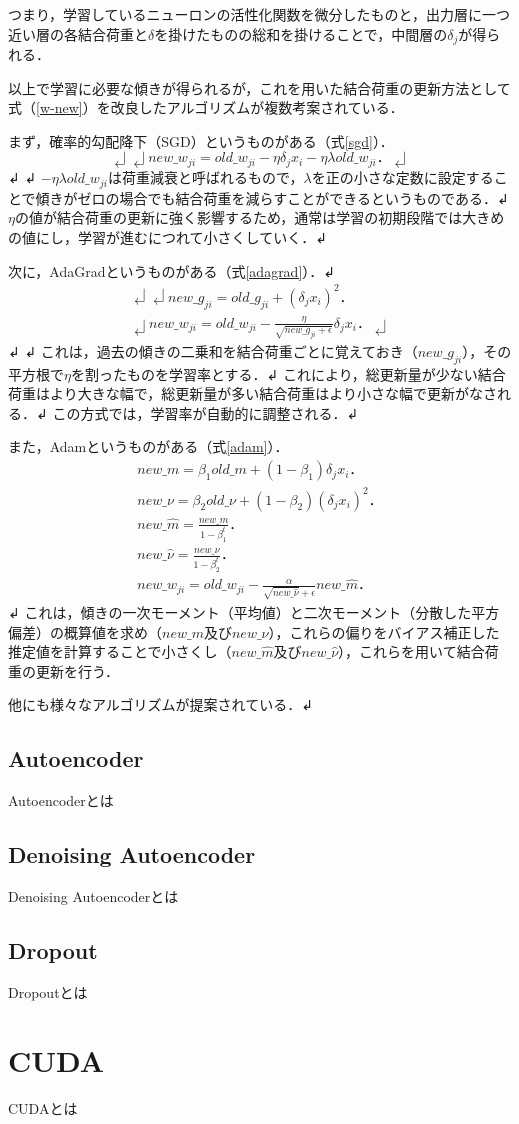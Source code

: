 つまり，学習しているニューロンの活性化関数を微分したものと，出力層に一つ近い層の各結合荷重と$\delta$を掛けたものの総和を掛けることで，中間層の$\delta_j$が得られる．

以上で学習に必要な傾きが得られるが，これを用いた結合荷重の更新方法として式（\ref{w-new}）を改良したアルゴリズムが複数考案されている．

まず，確率的勾配降下（SGD）というものがある（式\ref{sgd}）．
\begin{equation}↲
\label{sgd}↲
new\_w_{ji} = old\_w_{ji} - \eta \delta_j x_i - \eta \lambda old\_w_{ji}．↲
\end{equation}↲
↲
$- \eta \lambda old\_w_{ji}$は荷重減衰と呼ばれるもので，$\lambda$を正の小さな定数に設定することで傾きがゼロの場合でも結合荷重を減らすことができるというものである．↲
$\eta$の値が結合荷重の更新に強く影響するため，通常は学習の初期段階では大きめの値にし，学習が進むにつれて小さくしていく．↲

次に，AdaGradというものがある（式\ref{adagrad}）．↲
\begin{eqnarray}↲
\label{adagrad}↲
new\_g_{ji} = old\_g_{ji} + (\delta_j x_i)^2． \nonumber \\↲
new\_w_{ji} = old\_w_{ji} - \frac{\eta}{\sqrt{new\_g_{ji} + \epsilon}} \delta_j x_i．↲
\end{eqnarray}↲
↲
これは，過去の傾きの二乗和を結合荷重ごとに覚えておき（$new\_g_{ji}$），その平方根で$\eta$を割ったものを学習率とする．↲
これにより，総更新量が少ない結合荷重はより大きな幅で，総更新量が多い結合荷重はより小さな幅で更新がなされる．↲
この方式では，学習率が自動的に調整される．↲

また，Adamというものがある（式\ref{adam}）．
\begin{eqnarray}
\label{adam}
new\_m = \beta_1 old\_m + (1 - \beta_1) \delta_j x_i．\nonumber \\
new\_\nu = \beta_2 old\_\nu + (1 - \beta_2) (\delta_j x_i)^2．\nonumber \\
new\_\hat{m} = \frac{new\_m}{1 - \beta^t_1}．\nonumber \\
new\_\hat{\nu} = \frac{new\_\nu}{1 - \beta^t_2}．\nonumber \\
new\_w_{ji} = old\_w_{ji} - \frac{\alpha}{\sqrt{new\_\hat{\nu}} + \epsilon} new\_\hat{m}．
\end{eqnarray}
↲
これは，傾きの一次モーメント（平均値）と二次モーメント（分散した平方偏差）の概算値を求め（$new\_m$及び$new\_\nu$），これらの偏りをバイアス補正した推定値を計算することで小さくし（$new\_\hat{m}$及び$new\_\hat{\nu}$），これらを用いて結合荷重の更新を行う．

他にも様々なアルゴリズムが提案されている．↲

\subsection{Autoencoder}
Autoencoderとは

\subsection{Denoising Autoencoder}
Denoising Autoencoderとは

\subsection{Dropout}
Dropoutとは

\section{CUDA}
CUDAとは
